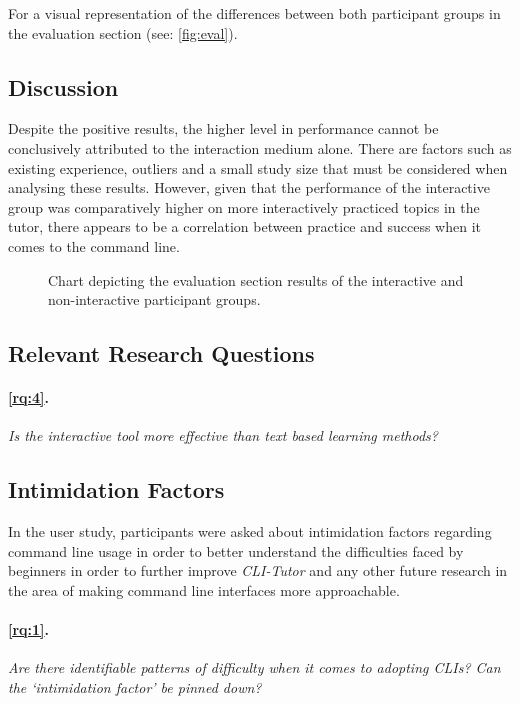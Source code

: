 For a visual representation of the differences between both participant groups
in the evaluation section (see: \autoref{fig:eval}).

\subsection{Discussion}

Despite the positive results, the higher level in performance cannot be
conclusively attributed to the interaction medium alone. There are factors such
as existing experience, outliers and a small study size that must be considered
when analysing these results. However, given that the performance of the
interactive group was comparatively higher on more interactively practiced
topics in the tutor, there appears to be a correlation between practice and
success when it comes to the command line.




\begin{figure}[htbp]
	\centering
	\scalebox{0.67}{}
	\caption{Chart depicting the evaluation section results of the interactive and non-interactive participant groups.}
	\label{fig:eval}
\end{figure}


\FloatBarrier %
\subsection{Relevant Research Questions}


\paragraph{\ref{rq:4}.} \textit{Is the interactive tool more effective than text based learning
methods?}


\subsection{Intimidation Factors}

In the user study, participants were asked about intimidation factors regarding
command line usage in order to better understand the difficulties faced by
beginners in order to further improve \textit{CLI-Tutor} and any other future
research in the area of making command line interfaces more approachable.


\paragraph{\ref{rq:1}.} \textit{Are there identifiable patterns of difficulty when it comes to
adopting CLIs? Can the `intimidation factor' be pinned down?}

